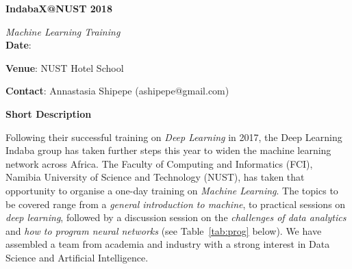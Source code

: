 \documentclass[10pt]{article}
\begin{document}
\thispagestyle{plain}
    \begin{center}
        \vspace*{1cm}

        \Large
        \textbf{IndabaX@NUST 2018}
        \vspace{0.2cm}

        \small
        \textit{Machine Learning Training}\\


        \vspace{1cm}
        \large
        \textbf{Date}: 

        \vspace{0.3cm}
        \large
        \textbf{Venue}: NUST Hotel School

        \vspace{0.5cm}
        \large
        \textbf{Contact}: Annastasia Shipepe (ashipepe@gmail.com)

        \vspace{0.5cm}
        \Large
        \textbf{Short Description}
    \end{center}

Following their successful training on \emph{Deep Learning} in 2017, the Deep Learning Indaba group has taken further steps this year to widen the machine
learning network across Africa. The Faculty of Computing and Informatics (FCI), Namibia University of Science and Technology (NUST), has taken that
opportunity to organise a one-day training on \emph{Machine Learning}. The topics to be covered range from a \emph{general introduction to machine}, to
practical sessions on \emph{deep learning}, followed by a discussion session on the \emph{challenges of data analytics} and \emph{how to program
neural networks} (see Table~\ref{tab:prog} below). We have assembled a team from academia and industry with a strong interest in Data Science and Artificial
Intelligence.

\end{document}
